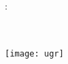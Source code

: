 \begin{titlepage}
    \begin{addmargin}[-1cm]{-1cm}
    \begin{center}
        \large

        \hfill

        \vfill

        \begingroup
            \color{CTtitle}\spacedallcaps{\myTitle} 
        \endgroup

        \spacedlowsmallcaps{\myName}\\\bigskip

        \small

        : \\
        \myProf \\[5pt]
        \myOtherProf \\ \bigskip


        \texttt{[image: ugr]} \\ \medskip

     
        \myDegree \\
        \myFaculty \\
        \myUni \\
        \myYear \\ \bigskip


        \vfill

    \end{center}
  \end{addmargin}
\end{titlepage}
